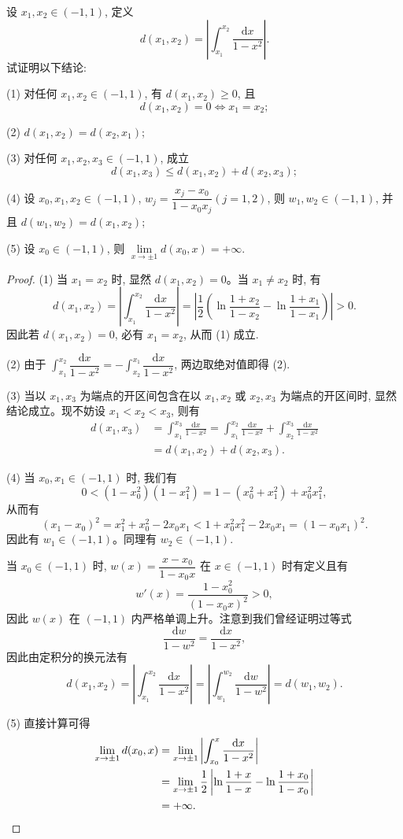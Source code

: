 \begin{example}\label{example:ma-7-4-8}
设 $x_1,x_2\in(-1,1)$, 定义
\[
  d(x_1,x_2)=\left|\int_{x_1}^{x_2}\frac{\mathrm dx}{1-x^2}\right|.
\]
试证明以下结论:

(1) 对任何 $x_1,x_2\in(-1,1)$, 有 $d(x_1,x_2)\geq0$, 且
\[
  d(x_1,x_2)=0\Longleftrightarrow x_1=x_2;
\]

(2) $d(x_1,x_2)=d(x_2,x_1)$;

(3) 对任何 $x_1,x_2,x_3\in(-1,1)$, 成立
\[
  d(x_1,x_3)\leq d(x_1,x_2)+d(x_2,x_3);
\]

(4) 设 $x_0,x_1,x_2\in(-1,1)$, $w_j=\dfrac{x_j-x_0}{1-x_0x_j}(j=1,2)$, 则 $w_1,w_2\in(-1,1)$, 并且 $d(w_1,w_2)=d(x_1,x_2)$;

(5) 设 $x_0\in(-1,1)$, 则 $\lim\limits_{x\to\pm1}d(x_0,x)=+\infty$.
\end{example}


\begin{proof}
(1) 当 $x_1=x_2$ 时, 显然 $d(x_1,x_2)=0$。当 $x_1\neq x_2$ 时, 有
\[
  d(x_1,x_2)
  =\left|\int_{x_1}^{x_2}\frac{\mathrm dx}{1-x^2}\right|
  =\left|\frac{1}{2}\left(\ln\frac{1+x_2}{1-x_2}-\ln\frac{1+x_1}{1-x_1}\right)\right|>0.
\]
因此若 $d(x_1,x_2)=0$, 必有 $x_1=x_2$, 从而 (1) 成立.

(2) 由于 $\int_{x_1}^{x_2}\dfrac{\mathrm dx}{1-x^2}=-\int_{x_2}^{x_1}\dfrac{\mathrm dx}{1-x^2}$, 两边取绝对值即得 (2).

(3) 当以 $x_1,x_3$ 为端点的开区间包含在以 $x_1,x_2$ 或 $x_2,x_3$ 为端点的开区间时, 显然结论成立。现不妨设 $x_1<x_2<x_3$, 则有
\[
\begin{aligned}
  d(x_1,x_3)
  &=\int_{x_1}^{x_3}\frac{\mathrm dx}{1-x^2}
  =\int_{x_1}^{x_2}\frac{\mathrm dx}{1-x^2}
  +\int_{x_2}^{x_3}\frac{\mathrm dx}{1-x^2}\\
  &=d(x_1,x_2)+d(x_2,x_3).
\end{aligned}
\]

(4) 当 $x_0,x_1\in(-1,1)$ 时, 我们有
\[
  0<(1-x_0^2)(1-x_1^2)=1-(x_0^2+x_1^2)+x_0^2x_1^2,
\]
从而有
\[
  (x_1-x_0)^2=x_1^2+x_0^2-2x_0x_1<1+x_0^2x_1^2-2x_0x_1=(1-x_0x_1)^2.
\]
因此有 $w_1\in(-1,1)$。同理有 $w_2\in(-1,1)$.

当 $x_0\in(-1,1)$ 时, $w(x)=\dfrac{x-x_0}{1-x_0x}$ 在 $x\in(-1,1)$ 时有定义且有
\[
  w'(x)=\frac{1-x_0^2}{(1-x_0x)^2}>0,
\]
因此 $w(x)$ 在 $(-1,1)$ 内严格单调上升。注意到我们曾经证明过等式
\[
  \frac{\mathrm dw}{1-w^2}=\frac{\mathrm dx}{1-x^2},
\]
因此由定积分的换元法有
\[
  d(x_1,x_2)=\left|\int_{x_1}^{x_2}\frac{\mathrm dx}{1-x^2}\right|
  =\left|\int_{w_1}^{w_2}\frac{\mathrm dw}{1-w^2}\right|
  =d(w_1,w_2).
\]

(5) 直接计算可得
\[
\begin{aligned}
  \lim_{x\to\pm1}d(x_0,x)
  &=\lim_{x\to\pm1}\left|\int_{x_0}^x\frac{\mathrm dx}{1-x^2}\right|\\
  &=\lim_{x\to\pm1}\frac{1}{2}
  \left|\ln\frac{1+x}{1-x}-\ln\frac{1+x_0}{1-x_0}\right|\\
  &=+\infty.
\end{aligned}
\qedhere
\]
\end{proof}


